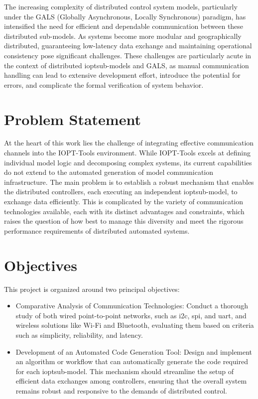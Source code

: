 The increasing complexity of distributed control system models, particularly under the GALS (Globally Asynchronous, Locally Synchronous) paradigm, has intensified the need for efficient and dependable communication between these distributed sub-models. As systems become more modular and geographically distributed, guaranteeing low-latency data exchange and maintaining operational consistency pose significant challenges. These challenges are particularly acute in the context of distributed \gls{iopt}sub-models and GALS, as manual communication handling can lead to extensive development effort, introduce the potential for errors, and complicate the formal verification of system behavior.


\section{Problem Statement}
\label{sec:problem_statement}


At the heart of this work lies the challenge of integrating effective communication channels into the IOPT-Tools environment. While IOPT-Tools excels at defining individual model logic and decomposing complex systems, its current capabilities do not extend to the automated generation of model communication infrastructure. The main problem is to establish a robust mechanism that enables the distributed controllers, each executing an independent \gls{iopt}sub-model, to exchange data efficiently. This is complicated by the variety of communication technologies available, each with its distinct advantages and constraints, which raises the question of how best to manage this diversity and meet the rigorous performance requirements of distributed automated systems.

\section{Objectives}
\label{sec:objectives}

This project is organized around two principal objectives:

\begin{itemize}
    \item Comparative Analysis of Communication Technologies: Conduct a thorough study of both wired point-to-point networks, such as \gls{i2c}, \gls{spi}, and \gls{uart}, and wireless solutions like Wi-Fi and Bluetooth, evaluating them based on criteria such as simplicity, reliability, and latency.
    \item Development of an Automated Code Generation Tool: Design and implement an algorithm or workflow that can automatically generate the code required for each \gls{iopt}sub-model. This mechanism should streamline the setup of efficient data exchanges among controllers, ensuring that the overall system remains robust and responsive to the demands of distributed control.
\end{itemize}


